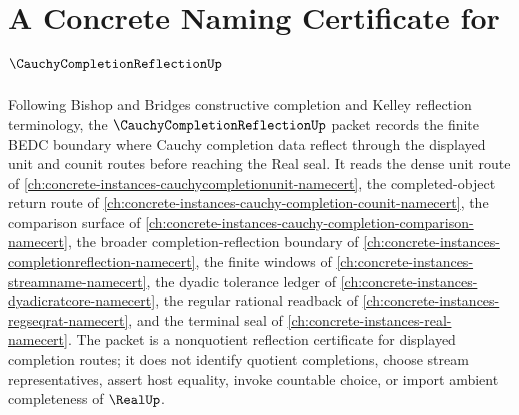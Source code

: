 \chapter{A Concrete Naming Certificate for $\CauchyCompletionReflectionUp$}
\label{ch:concrete-instances-cauchy-completion-reflection-namecert}

Following Bishop and Bridges constructive completion and Kelley reflection terminology, the $\CauchyCompletionReflectionUp$ packet records the finite BEDC boundary where Cauchy completion data reflect through the displayed unit and counit routes before reaching the Real seal. It reads the dense unit route of \autoref{ch:concrete-instances-cauchycompletionunit-namecert}, the completed-object return route of \autoref{ch:concrete-instances-cauchy-completion-counit-namecert}, the comparison surface of \autoref{ch:concrete-instances-cauchy-completion-comparison-namecert}, the broader completion-reflection boundary of \autoref{ch:concrete-instances-completionreflection-namecert}, the finite windows of \autoref{ch:concrete-instances-streamname-namecert}, the dyadic tolerance ledger of \autoref{ch:concrete-instances-dyadicratcore-namecert}, the regular rational readback of \autoref{ch:concrete-instances-regseqrat-namecert}, and the terminal seal of \autoref{ch:concrete-instances-real-namecert}. The packet is a nonquotient reflection certificate for displayed completion routes; it does not identify quotient completions, choose stream representatives, assert host equality, invoke countable choice, or import ambient completeness of $\RealUp$.

